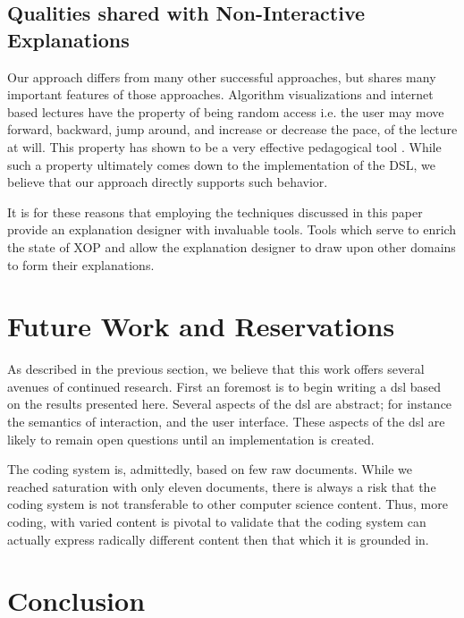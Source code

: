 \documentclass[sigconf]{acmart}
\begin{document}
\subsection{Qualities shared with Non-Interactive Explanations}
Our approach differs from many other successful
approaches\cite{brecht2012learning, brecht2008enabling}, but shares many
important features of those approaches. Algorithm visualizations and internet
based lectures have the property of being random access i.e. the user may move
forward, backward, jump around, and increase or decrease the pace, of the
lecture at will. This property has shown to be a very effective pedagogical
tool\cite{cardall2008live, zhang2005interactive, zhang2006instructional,
  Schwan2004293, Merkt2011687} . While such a property ultimately comes down to
the implementation of the DSL, we believe that our approach directly supports
such behavior.

It is for these reasons that employing the techniques discussed in this paper
provide an explanation designer with invaluable tools. Tools which serve to
enrich the state of XOP and allow the explanation designer to draw upon other
domains to form their explanations.

\section{Future Work and Reservations}

As described in the previous section, we believe that this work offers several
avenues of continued research. First an foremost is to begin writing a dsl based
on the results presented here. Several aspects of the dsl are abstract; for
instance the semantics of interaction, and the user interface. These aspects of
the dsl are likely to remain open questions until an implementation is created. 

The coding system is, admittedly, based on few raw documents. While we reached
saturation with only eleven documents, there is always a risk that the coding
system is not transferable to other computer science content. Thus, more coding,
with varied content is pivotal to validate that the coding system can actually
express radically different content then that which it is grounded in.


\section{Conclusion}



\end{document}
